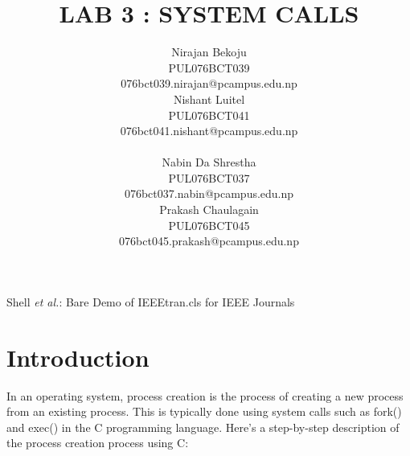 \documentclass[journal,onecolumn]{IEEEtran}
\begin{document}
\title{LAB 3 : SYSTEM CALLS}

\author{
  \begin{multicols}{2}
    \centering
    Nirajan Bekoju\\
    PUL076BCT039\\
    076bct039.nirajan@pcampus.edu.np\\
    \columnbreak
    Nishant Luitel\\
    PUL076BCT041 \\
    076bct041.nishant@pcampus.edu.np \\
  \end{multicols}
  \begin{multicols}{2}
    \centering
    Nabin Da Shrestha\\
    PUL076BCT037 \\
    076bct037.nabin@pcampus.edu.np \\
    \columnbreak
    Prakash Chaulagain \\
    PUL076BCT045 \\
    076bct045.prakash@pcampus.edu.np
  \end{multicols}
}

%
{Shell \MakeLowercase{\textit{et al.}}: Bare Demo of IEEEtran.cls for IEEE Journals}

\maketitle

\IEEEpeerreviewmaketitle

\section{Introduction}
In an operating system, process creation is the process of creating a new process from an existing process. This is typically done using system calls such as fork() and exec() in the C programming language. Here's a step-by-step description of the process creation process using C:
\end{document}
